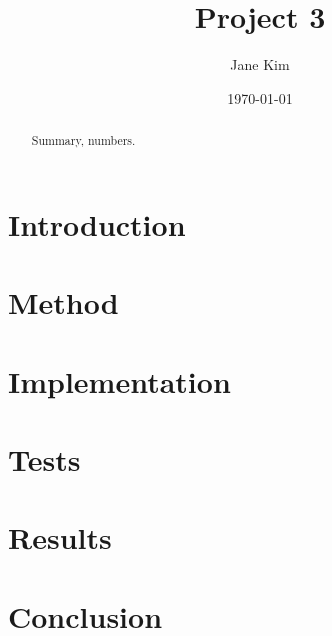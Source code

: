 \documentclass[prb,aps,twocolumn,showpacs,10pt]{revtex4-1}
\begin{document}
\title {Project 3}

\author{Jane Kim}
\date{\today}


\begin{abstract}

\vspace*{5mm}
\noindent Summary, numbers.
\end{abstract}

\maketitle

\section{Introduction}



\section{Method}


\section{Implementation}


\section{Tests}

\section{Results}

\section{Conclusion}
\end{document}
